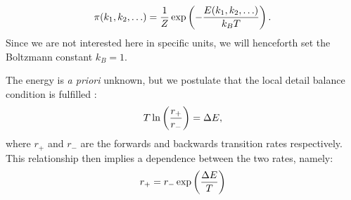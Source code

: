 \documentclass[a4paper,10pt]{paper}%
\begin{document}
%
% 
\begin{equation}
\label{boltzmann}
\pi (k_1, k_2, \ldots)={1\over Z}\exp\left(-{E(k_1, k_2, \ldots)\over k_BT}\right). 
\end{equation}
%
% 
Since we are not interested here in specific units, we will henceforth set the Boltzmann constant $k_B=1$.
\par
The energy is {\em a priori} unknown, but we postulate that the local detail balance condition is fulfilled \cite{localdetailedbalance}:
%
% 
\begin{equation}
T\ln\left({r_+\over r_-}\right) = \Delta E,
\label{localdetailedbalance}
\end{equation}
%
% 
where  $r_+$ and $r_-$ are the forwards and backwards transition rates respectively.
This relationship then implies a dependence between the two rates, namely:
%
% 
\begin{equation}
r_+=r_- \exp\left({\Delta E\over T}\right)
\end{equation}
%
% 
\end{document}
